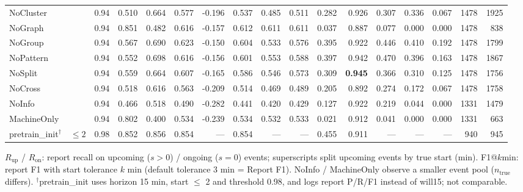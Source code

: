 \documentclass[9pt,a4paper,twocolumn]{extarticle}
\begin{document}
\begin{table}[tp]
\begin{tabular}{llrrrrrrrrrrrrrrr}
NoCluster &  & 0.94 & 0.510 & 0.664 & 0.577 & -0.196 & 0.537 & 0.485 & 0.511 & 0.282 & 0.926 & 0.307 & 0.336 & 0.067 & 1478 & 1925 \\
NoGraph &  & 0.94 & 0.851 & 0.482 & 0.616 & -0.157 & 0.612 & 0.611 & 0.611 & 0.037 & 0.887 & 0.077 & 0.000 & 0.000 & 1478 & 838 \\
NoGroup &  & 0.94 & 0.567 & 0.690 & 0.623 & -0.150 & 0.604 & 0.533 & 0.576 & 0.395 & 0.922 & 0.446 & 0.410 & 0.192 & 1478 & 1799 \\
NoPattern &  & 0.94 & 0.552 & 0.698 & 0.616 & -0.156 & 0.601 & 0.553 & 0.588 & 0.397 & 0.942 & 0.470 & 0.396 & 0.163 & 1478 & 1867 \\
NoSplit &  & 0.94 & 0.559 & 0.664 & 0.607 & -0.165 & 0.586 & 0.546 & 0.573 & 0.309 & \textbf{0.945} & 0.366 & 0.310 & 0.125 & 1478 & 1756 \\
NoCross &  & 0.94 & 0.518 & 0.616 & 0.563 & -0.209 & 0.514 & 0.469 & 0.489 & 0.205 & 0.892 & 0.274 & 0.172 & 0.067 & 1478 & 1758 \\
NoInfo &  & 0.94 & 0.466 & 0.518 & 0.490 & -0.282 & 0.441 & 0.420 & 0.429 & 0.127 & 0.922 & 0.219 & 0.044 & 0.000 & 1331 & 1479 \\
MachineOnly &  & 0.94 & 0.802 & 0.400 & 0.534 & -0.239 & 0.534 & 0.532 & 0.533 & 0.021 & 0.912 & 0.041 & 0.000 & 0.000 & 1331 & 663 \\
\midrule
pretrain\_init$^\dagger$ & $\le 2$ & 0.98 & 0.852 & 0.856 & 0.854 & --- & 0.854 & --- & --- & 0.455 & 0.911 & --- & --- & --- & 940 & 945 \\
\bottomrule
\end{tabular}
\par\smallskip\parbox{\textwidth}{\scriptsize $R_{\mathrm{up}}$ / $R_{\mathrm{on}}$: report recall on upcoming ($s>0$) / ongoing ($s=0$) events; superscripts split upcoming events by true start (min). F1@$k$min: report F1 with start tolerance $k$ min (default tolerance 3 min = Report F1). NoInfo / MachineOnly observe a smaller event pool ($n_{\mathrm{true}}$ differs). $^\dagger$pretrain\_init uses horizon 15 min, start $\le$ 2 and threshold 0.98, and logs report P/R/F1 instead of will15; not comparable.}
\end{table}
\end{document}
